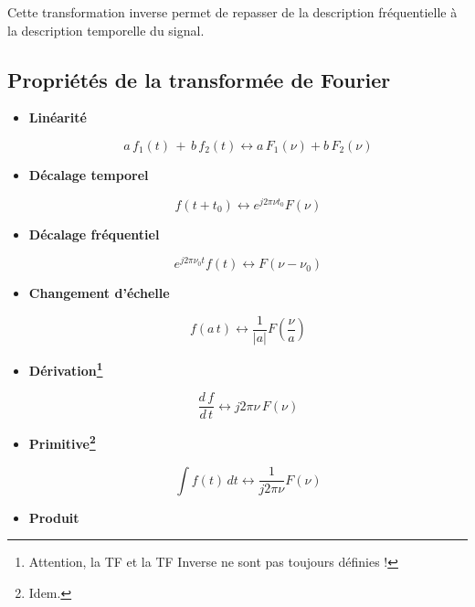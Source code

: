 Cette transformation inverse permet de repasser de la description fréquentielle à la description temporelle du signal. 

\vfill
\pagebreak
\subsection*{Propriétés de la transformée de Fourier}
\bigskip
\begin{itemize}
\item \textbf{Linéarité} 

\begin{equation}
a\,f_1(t)\,+\,b\,f_2(t) \leftrightarrow a\,F_1(\nu) + b\,F_2(\nu) 
\end{equation}

\item \textbf{Décalage temporel} 

\begin{equation}
f(t+t_0) \leftrightarrow e^{j2\pi\nu t_0}F(\nu)
\end{equation}

\item \textbf{Décalage fréquentiel} 

\begin{equation}
	e^{j2\pi\nu_0t}f(t) \leftrightarrow F(\nu-\nu_0)
\end{equation}

\item \textbf{Changement d'échelle} 

\begin{equation}
f(a\,t) \leftrightarrow \dfrac{1}{\left| a \right|} F\left( \dfrac{\nu}{a}\right)
\end{equation}

\item \textbf{Dérivation\footnote{Attention, la TF et la TF Inverse ne sont pas toujours définies !}}

\begin{equation}
	\dfrac{d\,f}{d\,t} \leftrightarrow j2\pi\nu\,F(\nu)
\end{equation}

\item \textbf{Primitive\footnote{Idem.}}

\begin{equation}
\int f(t)\,dt \leftrightarrow \dfrac{1}{j2\pi\nu}F(\nu)
\end{equation}

\item \textbf{Produit}


\end{itemize}
